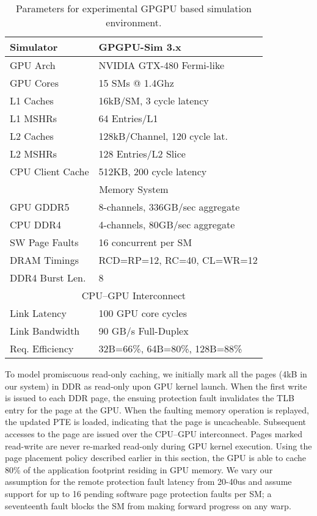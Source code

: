 \begin{table}[t]
\begin{center}
\begin{tabular}{|l|l|}
\hline
Simulator & GPGPU-Sim 3.x\\
\hline
GPU Arch & NVIDIA GTX-480 Fermi-like\\
\hline
GPU Cores& 15 SMs @ 1.4Ghz\\
\hline
L1 Caches & 16kB/SM, 3 cycle latency\\
\hline
L1 MSHRs & 64 Entries/L1\\
\hline
L2 Caches & 128kB/Channel, 120 cycle lat.\\
\hline
L2 MSHRs & 128 Entries/L2 Slice\\
\hline
CPU Client Cache & 512KB, 200 cycle latency\\
\hline
\hline
\multicolumn{2}{|c|}{Memory System}\\
\hline
GPU GDDR5 & 8-channels, 336GB/sec aggregate\\
\hline
CPU DDR4& 4-channels, 80GB/sec aggregate\\
\hline
SW Page Faults& 16 concurrent per SM\\
\hline
DRAM Timings & \multicolumn{1}{|l|}{RCD=RP=12, RC=40, CL=WR=12}\\
\hline
DDR4 Burst Len.& 8\\
\hline
\hline
\multicolumn{2}{|c|}{CPU--GPU Interconnect}\\
\hline
Link Latency& 100 GPU core cycles\\
\hline
Link Bandwidth& 90 GB/s Full-Duplex\\
\hline
Req. Efficiency& 32B=66\%, 64B=80\%, 128B=88\%\\
\hline
\end{tabular}
\caption{Parameters for experimental GPGPU based simulation environment.}
\label{tab:methodology}
\end{center}
\end{table}

To model promiscuous read-only caching, we initially mark all the pages (4kB
in our system) in DDR as read-only upon GPU kernel launch. When the first 
write is issued to each DDR page, the ensuing
protection fault invalidates the TLB entry for the page at the GPU. 
When the faulting memory operation is replayed, the updated 
PTE is loaded, indicating that the page is uncacheable.  Subsequent accesses
to the page are issued over the CPU--GPU interconnect.
Pages marked read-write are never re-marked
read-only during GPU kernel execution. Using the page placement policy described
earlier in this section, the GPU is able to cache 80\% of the application footprint residing
in GPU memory. We vary our assumption for the remote protection fault latency from
20-40us and assume support for up to 16 pending software
page protection faults per SM; a seventeenth fault blocks the SM from making forward
progress on any warp.

